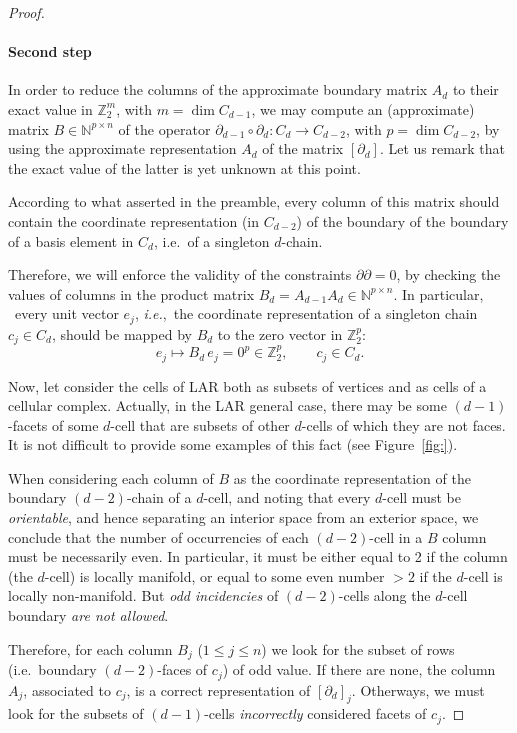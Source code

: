 \documentclass[11pt,oneside]{article}	%
\def\N{\mathbb{N}}
\def\Z{\mathbb{Z}}
\begin{document}
\begin{proof}
\paragraph{Second step} 
In order to reduce the columns of the approximate boundary matrix $A_d$ to their exact value in $\Z_2^m$, with $m=\dim C_{d-1}$, we may compute an (approximate) matrix $B\in\N^{p\times n}$ of the operator $\partial_{d-1}\circ\partial_d: C_d \to C_{d-2}$, with $p=\dim C_{d-2}$, by using the approximate representation $A_d$ of the matrix $[\partial_d]$. Let us remark that the exact value of the latter is yet unknown at this point.

According to what asserted in the preamble, every column of this matrix should contain the coordinate representation (in $C_{d-2}$) of the boundary of the boundary of a basis element in $C_d$, i.e.~of a singleton $d$-chain.

Therefore, we will enforce the validity of the constraints $\partial\partial=0$, by checking
the values of columns in the product matrix $B_d = A_{d-1} A_d \in \N^{p\times n}$. In particular, ~every unit vector $e_j$, \emph{i.e.},~the coordinate representation of a singleton chain $c_j\in C_d$, should be mapped by $B_d$ to the zero vector in $\Z_2^p$:
\begin{equation}
e_j \mapsto B_d\, e_j = 0^{p} \in \Z_2^p, \qquad c_j\in C_d.
\label{eq:boundaryofboundary}
\end{equation}

Now, let consider the cells of LAR both as subsets of vertices and as cells of a cellular complex.
Actually, in the LAR general case, there may be some $(d-1)$-facets of some $d$-cell that are subsets of other $d$-cells of which they are not faces. It is not difficult to provide some examples of this fact (see Figure~\ref{fig:}).

When considering each column of $B$ as the coordinate representation of the boundary $(d-2)$-chain of a $d$-cell, and noting that every $d$-cell must be \emph{orientable}, and hence separating an interior space from an exterior space, we conclude that the number of occurrencies of each $(d-2)$-cell in a $B$ column must be necessarily even. In particular, it must be either equal to 2 if the column (the $d$-cell) is locally manifold, or equal to some even number $>2$ if the $d$-cell is locally non-manifold. But \emph{odd incidencies} of $(d-2)$-cells along the $d$-cell boundary \emph{are not allowed}. 

Therefore, for each column $B_j$ ($1\leq j\leq n$) we look for the subset of rows (i.e.~boundary $(d-2)$-faces of $c_j$) of odd value. If there are none, the column $A_j$, associated to $c_j$, is a correct representation of $[\partial_d]_j$. Otherways, we must look for the subsets of $(d-1)$-cells \emph{incorrectly} considered facets of $c_j$.


\end{proof}
\end{document}
